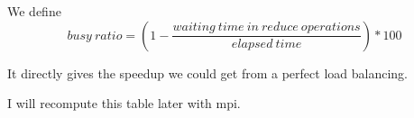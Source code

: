 \documentclass[a4paper]{article}
\begin{document}
We define
$$busy\ ratio = (1 - \frac{waiting\ time\ in\ reduce\ operations}{elapsed\ time}) * 100$$

It directly gives the speedup we could get from a perfect load balancing.\newline

I will recompute this table later with mpi.




\end{document}
